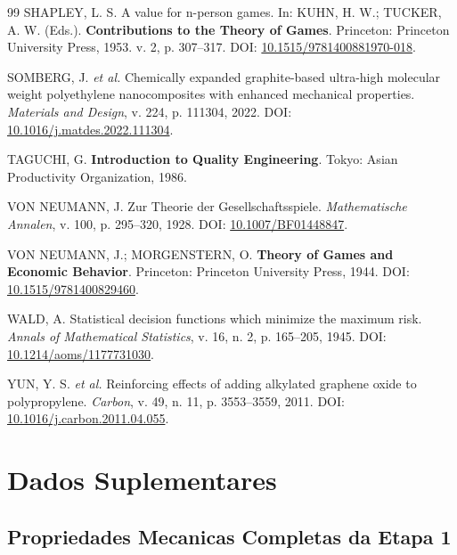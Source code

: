 \documentclass[11pt,a4paper,oneside]{article}
\begin{document}
\begin{thebibliography}{99}
 SHAPLEY, L. S. A value for n-person games. In: KUHN, H. W.; TUCKER, A. W. (Eds.). \textbf{Contributions to the Theory of Games}. Princeton: Princeton University Press, 1953. v. 2, p. 307--317. DOI: \href{https://doi.org/10.1515/9781400881970-018}{10.1515/9781400881970-018}.

 SOMBERG, J. \textit{et al.} Chemically expanded graphite-based ultra-high molecular weight polyethylene nanocomposites with enhanced mechanical properties. \textit{Materials and Design}, v. 224, p. 111304, 2022. DOI: \href{https://doi.org/10.1016/j.matdes.2022.111304}{10.1016/j.matdes.2022.111304}.

 TAGUCHI, G. \textbf{Introduction to Quality Engineering}. Tokyo: Asian Productivity Organization, 1986.

 VON NEUMANN, J. Zur Theorie der Gesellschaftsspiele. \textit{Mathematische Annalen}, v. 100, p. 295--320, 1928. DOI: \href{https://doi.org/10.1007/BF01448847}{10.1007/BF01448847}.

 VON NEUMANN, J.; MORGENSTERN, O. \textbf{Theory of Games and Economic Behavior}. Princeton: Princeton University Press, 1944. DOI: \href{https://doi.org/10.1515/9781400829460}{10.1515/9781400829460}.

 WALD, A. Statistical decision functions which minimize the maximum risk. \textit{Annals of Mathematical Statistics}, v. 16, n. 2, p. 165--205, 1945. DOI: \href{https://doi.org/10.1214/aoms/1177731030}{10.1214/aoms/1177731030}.

 YUN, Y. S. \textit{et al.} Reinforcing effects of adding alkylated graphene oxide to polypropylene. \textit{Carbon}, v. 49, n. 11, p. 3553--3559, 2011. DOI: \href{https://doi.org/10.1016/j.carbon.2011.04.055}{10.1016/j.carbon.2011.04.055}.

\end{thebibliography}

\appendix
\section{Dados Suplementares}

\subsection{Propriedades Mecanicas Completas da Etapa 1}
\end{document}
